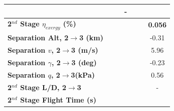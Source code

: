 \begin{table}[ht]
\begin{tabular}{l c c c c c c}
		& \firstsecondSeparationgammaTThreeOneHundredFiveNoReturn
		& \firstsecondSeparationgammaTThreeOneHundredTenNoReturn
		& -
		\\
		\hline 
		\textbf{2$^{nd}$ Stage $\eta_{exergy}$ (\%)}
		& \textbf{\secondExergyEffTThreeNinetyNoReturn}
		& \textbf{\secondExergyEffTThreeNinetyFiveNoReturn}
		& \textbf{\secondExergyEffTThreeStandardNoReturn}
		& \textbf{\secondExergyEffTThreeOneHundredFiveNoReturn}
		& \textbf{\secondExergyEffTThreeOneHundredTenNoReturn}
		& \textbf{0.056}
		\\
		\textbf{Separation Alt, 2$\rightarrow$3 (km)}
		& \secondthirdSeparationAltTThreeNinetyNoReturn
		& \secondthirdSeparationAltTThreeNinetyFiveNoReturn
		& \secondthirdSeparationAltTThreeStandardNoReturn
		& \secondthirdSeparationAltTThreeOneHundredFiveNoReturn
		& \secondthirdSeparationAltTThreeOneHundredTenNoReturn
		&-0.31
		\\
		\textbf{Separation $v$, 2$\rightarrow$3 (m/s)}
		& \secondthirdSeparationvTThreeNinetyNoReturn
		& \secondthirdSeparationvTThreeNinetyFiveNoReturn
		& \secondthirdSeparationvTThreeStandardNoReturn
		& \secondthirdSeparationvTThreeOneHundredFiveNoReturn
		& \secondthirdSeparationvTThreeOneHundredTenNoReturn
		&5.96
		\\
		\textbf{Separation $\gamma$, 2$\rightarrow$3 (deg)}
		& \secondthirdSeparationgammaTThreeNinetyNoReturn
		& \secondthirdSeparationgammaTThreeNinetyFiveNoReturn
		& \secondthirdSeparationgammaTThreeStandardNoReturn
		& \secondthirdSeparationgammaTThreeOneHundredFiveNoReturn
		& \secondthirdSeparationgammaTThreeOneHundredTenNoReturn
		&-0.23
		\\
		\textbf{Separation $q$, 2$\rightarrow$3(kPa)}
		& \secondthirdSeparationqTThreeNinetyNoReturn
		& \secondthirdSeparationqTThreeNinetyFiveNoReturn
		& \secondthirdSeparationqTThreeStandardNoReturn
		& \secondthirdSeparationqTThreeOneHundredFiveNoReturn
		& \secondthirdSeparationqTThreeOneHundredTenNoReturn
		&0.56
		\\
		\textbf{2$^{nd}$ Stage L/D, 2$\rightarrow$3}
		& \secondthirdSeparationLDTThreeNinetyNoReturn
		& \secondthirdSeparationLDTThreeNinetyFiveNoReturn
		& \secondthirdSeparationLDTThreeStandardNoReturn
		& \secondthirdSeparationLDTThreeOneHundredFiveNoReturn
		& \secondthirdSeparationLDTThreeOneHundredTenNoReturn
		& -
		\\
		\textbf{2$^{nd}$ Stage Flight Time (s)}
		& \secondFlightTimeTThreeNinetyNoReturn
		& \secondFlightTimeTThreeNinetyFiveNoReturn
		& \secondFlightTimeTThreeStandardNoReturn
		& \secondFlightTimeTThreeOneHundredFiveNoReturn

\end{tabular}
\end{table}
